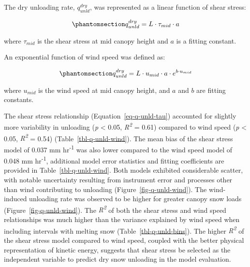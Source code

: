 \documentclass[
  letterpaper,
]{tex/uofsthesis-cs}
\begin{document}
The dry unloading rate, \(q_{unld}^{dry}\), was represented as a linear
function of shear stress:

\begin{equation}\phantomsection\label{eq-q-unld-tau}{
q_{unld}^{dry} = L \cdot \tau_{mid} \cdot a
}\end{equation}

where \(\tau_{mid}\) is the shear stress at mid canopy height and \(a\)
is a fitting constant.

An exponential function of wind speed was defined as:

\begin{equation}\phantomsection\label{eq-q-unld-wind}{
q_{unld}^{dry} = L \cdot u_{mid} \cdot a \cdot e^{b\cdot u_{mid}}
}\end{equation}

where \(u_{mid}\) is the wind speed at mid canopy height, and \(a\) and
\(b\) are fitting constants.

The shear stress relationship (Equation~\ref{eq-q-unld-tau}) accounted
for slightly more variability in unloading (\emph{p} \textless{} 0.05,
\emph{R\textsuperscript{2}} = 0.61) compared to wind speed (\emph{p}
\textless{} 0.05, \emph{R\textsuperscript{2}} = 0.54)
(Table~\ref{tbl-q-unld-wind}). The mean bias of the shear stress model
of 0.037 mm hr\textsuperscript{-1} was also lower compared to the wind
speed model of 0.048 mm hr\textsuperscript{-1}, additional model error
statistics and fitting coefficients are provided in
Table~\ref{tbl-q-unld-wind}. Both models exhibited considerable scatter,
with notable uncertainty resulting from instrument error and processes
other than wind contributing to unloading
(Figure~\ref{fig-q-unld-wind}). The wind-induced unloading rate was
observed to be higher for greater canopy snow loads
(Figure~\ref{fig-q-unld-wind}). The \emph{R\textsuperscript{2}} of both
the shear stress and wind speed relationships was much higher than the
variance explained by wind speed when including intervals with melting
snow (Table~\ref{tbl-q-unld-bins}). The higher
\emph{R\textsuperscript{2}} of the shear stress model compared to wind
speed, coupled with the better physical representation of kinetic
energy, suggests that shear stress be selected as the independent
variable to predict dry snow unloading in the model evaluation.
\end{document}
